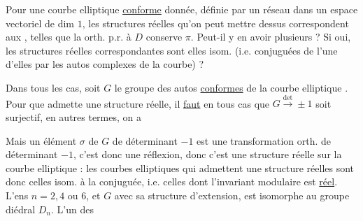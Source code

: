 Pour une courbe elliptique \uline{conforme} donnée, définie
par un réseau \inserted{$\pi$} dans un espace vectoriel  de dim $1$,
les structures réelles qu'on peut mettre dessus correspondent
aux , telles que la
 orth.
p.r. à $D$ conserve $\pi$. Peut-il y en avoir plusieurs ?
Si oui, les structures réelles correspondantes sont elles isom.
(i.e. conjuguées de l'une d'elles par les autos complexes
de la courbe) ? 

 Dans tous les cas, soit $G$ le groupe des autos
\uline{conformes} de la courbe elliptique .
Pour que  admette une structure réelle, il \uline{faut} en
tous cas que $G\overset{\mathrm{det}}\longrightarrow\pm1$ soit surjectif, en autres termes,
on a

Mais un élément $\sigma$ de $G$ de déterminant $-1$
est une transformation orth. de déterminant $-1$,
c'est donc une réflexion, donc c'est une structure
réelle sur la courbe elliptique : les courbes elliptiques
qui admettent une structure réelles sont donc celles
isom. à la conjuguée, i.e. celles dont l'invariant
modulaire est \uline{réel}. L'ens 
 $n=2,4$ ou $6$, et $G$ 
avec sa structure d'extension,
est isomorphe au groupe diédral $D_n$. L'un des
